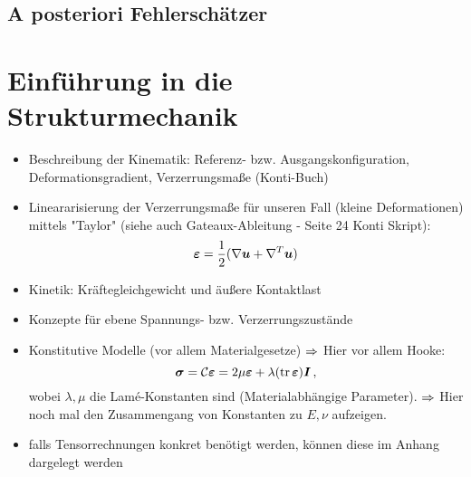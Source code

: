 \subsection{A posteriori Fehlerschätzer}


\section{Einführung in die Strukturmechanik}

\begin{itemize}
\item Beschreibung der Kinematik: Referenz- bzw. Ausgangskonfiguration, Deformationsgradient, Verzerrungsmaße (Konti-Buch)
\item Lineararisierung der Verzerrungsmaße für unseren Fall (kleine Deformationen) mittels "Taylor" (siehe auch Gateaux-Ableitung - Seite 24 Konti Skript):
\[
	\boldsymbol {\varepsilon} = \frac 1 2 (\nabla \boldsymbol u + \nabla^T \boldsymbol u)
\]
\item Kinetik: Kräftegleichgewicht und äußere Kontaktlast
\item Konzepte für ebene Spannungs- bzw. Verzerrungszustände
\item Konstitutive Modelle (vor allem Materialgesetze) $\Rightarrow$ Hier vor allem Hooke:
\[
	\boldsymbol \sigma = \mathcal C \boldsymbol {\varepsilon} = 2 \mu \boldsymbol {\varepsilon} + \lambda (\operatorname{tr} \boldsymbol {\varepsilon}) \boldsymbol I \, ,
\]
wobei $\lambda,\mu$ die Lamé-Konstanten sind (Materialabhängige Parameter). $\Rightarrow$ Hier noch mal den Zusammengang von Konstanten zu $E,\nu$ aufzeigen.
\item falls Tensorrechnungen konkret benötigt werden, können diese im Anhang dargelegt werden
\end{itemize}


\newpage


